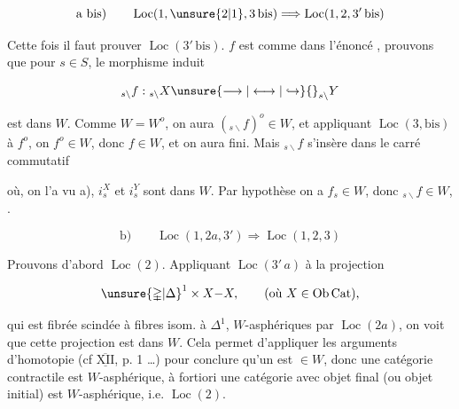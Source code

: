 \[
\text{a bis)}\qquad \operatorname{Loc}(1,\unsure{2|1},3\,\mathrm{bis})\Longrightarrow \operatorname{Loc}(1,2,3'\,\mathrm{bis})
\]

Cette fois il faut prouver  $\operatorname{Loc}(3'\,\mathrm{bis})$.    $f$ est comme dans l'énoncé , prouvons que pour   $s\in S$, le  morphisme induit

\[
{}_{s\backslash}f:{}_{s\backslash}X\unsure{\longrightarrow|\longleftrightarrow|\hookrightarrow}{}_{s\backslash}Y
\]

est dans $W$. Comme $W=W^{o}$, on aura  $({}_{s\backslash}f)^o\in W$, et appliquant $\operatorname{Loc}(3,\mathrm{bis})$ à $f^o$, on  $f^o\in W$, donc $f\in W$, et on aura fini. Mais $ {}_{s\backslash}f$ s'insère dans  le carré commutatif




où, on l'a vu  a), $i_s^X$ et $i_s^Y$ sont dans $W$. Par hypothèse on a $f_s\in W$, donc $ {}_{s\backslash}f\in W$, .

\[
\text{b)}\qquad \operatorname{Loc}(1,2a,3')\Longrightarrow\operatorname{Loc}(1,2,3)
\]

Prouvons d'abord $\operatorname{Loc}(2)$. Appliquant $\operatorname{Loc}(3'\,a)$ à la projection

\[
\unsure{\mathbb{\Delta}|\Delta}^{1}\times X{-}X,\qquad(\text{où }X\in\operatorname{Ob}\mathrm{Cat}),
\]

 qui est fibrée scindée à fibres isom. à $\mathbb{\Delta}^{1}$,  $W$-asphériques par $\operatorname{Loc}(2a)$, on voit que cette projection est dans $W$. Cela permet d'appliquer les arguments  d'homotopie (cf $\overline{\underline{\mathrm{XII}}}$, p. 1 \ldots) pour conclure qu'un  est $\in W$, donc une catégorie contractile est $W$-asphérique, à fortiori une catégorie avec objet final (ou  objet initial) est $W$-asphérique,  i.e. $\operatorname{Loc}(2)$.

